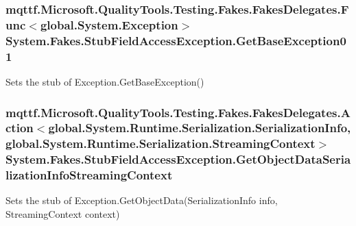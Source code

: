 \hypertarget{class_system_1_1_fakes_1_1_stub_field_access_exception_a06395dbbb598442a4d115f5de2759ac5}{
\subsubsection[{Get\-Base\-Exception01}]{\setlength{\rightskip}{0pt plus 5cm}mqttf.\-Microsoft.\-Quality\-Tools.\-Testing.\-Fakes.\-Fakes\-Delegates.\-Func$<$global.\-System.\-Exception$>$ System.\-Fakes.\-Stub\-Field\-Access\-Exception.\-Get\-Base\-Exception01}}\label{class_system_1_1_fakes_1_1_stub_field_access_exception_a06395dbbb598442a4d115f5de2759ac5}


Sets the stub of Exception.\-Get\-Base\-Exception()

\hypertarget{class_system_1_1_fakes_1_1_stub_field_access_exception_aa8503d417a6a29415ac005454a3bf1d3}{
\subsubsection[{Get\-Object\-Data\-Serialization\-Info\-Streaming\-Context}]{\setlength{\rightskip}{0pt plus 5cm}mqttf.\-Microsoft.\-Quality\-Tools.\-Testing.\-Fakes.\-Fakes\-Delegates.\-Action$<$global.\-System.\-Runtime.\-Serialization.\-Serialization\-Info, global.\-System.\-Runtime.\-Serialization.\-Streaming\-Context$>$ System.\-Fakes.\-Stub\-Field\-Access\-Exception.\-Get\-Object\-Data\-Serialization\-Info\-Streaming\-Context}}\label{class_system_1_1_fakes_1_1_stub_field_access_exception_aa8503d417a6a29415ac005454a3bf1d3}


Sets the stub of Exception.\-Get\-Object\-Data(\-Serialization\-Info info, Streaming\-Context context)

